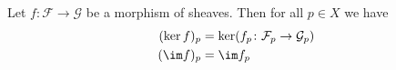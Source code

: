 Let $f\colon \mathcal{F}\to \mathcal{G}$ be a morphism of sheaves. Then
for all $p \in X$ we have
\begin{align*}
	(\ker f)_p &= \ker(f_p\colon \mathcal{F}_p\to \mathcal{G}_p)\\
	(\im f)_p &= \im f_p
\end{align*}
